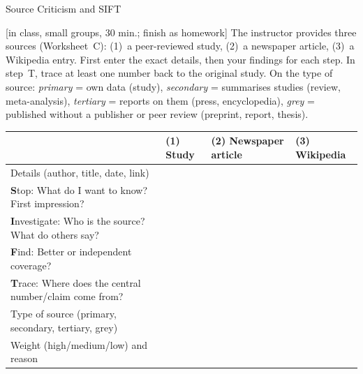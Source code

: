 \begin{uebungsblatt}{Source Criticism and SIFT}

[in class, small groups, 30 min.; finish as homework]
The instructor provides three sources (Worksheet~C): (1)~a peer-reviewed
study, (2)~a newspaper article, (3)~a Wikipedia entry. First enter the exact details,
then your findings for each step. In step~T, trace at least one number back
to the original study. On the type of source: \emph{primary} = own data
(study), \emph{secondary} = summarises studies (review, meta-analysis),
\emph{tertiary} = reports on them (press, encyclopedia), \emph{grey} =
published without a publisher or peer review (preprint, report, thesis).

\begin{center}
\small
\renewcommand{\arraystretch}{1.3}
\begin{tabular}{|>{\raggedright\arraybackslash}p{}|p{}|p{}|p{}|}
\hline
 & \textbf{(1) Study} & \textbf{(2) Newspaper article} & \textbf{(3) Wikipedia} \\
\hline
Details (author, title, date, link) & \rule{0pt}{14mm} & & \\ \hline
\textbf{S}top: What do I want to know? First impression? & \rule{0pt}{16mm} & & \\ \hline
\textbf{I}nvestigate: Who is the source? What do others say? & \rule{0pt}{18mm} & & \\ \hline
\textbf{F}ind: Better or independent coverage? & \rule{0pt}{16mm} & & \\ \hline
\textbf{T}race: Where does the central number/claim come from? & \rule{0pt}{18mm} & & \\ \hline
Type of source (primary, secondary, tertiary, grey) & \rule{0pt}{9mm} & & \\ \hline
Weight (high/medium/low) and reason & \rule{0pt}{16mm} & & \\ \hline
\end{tabular}
\end{center}
\end{uebungsblatt}

